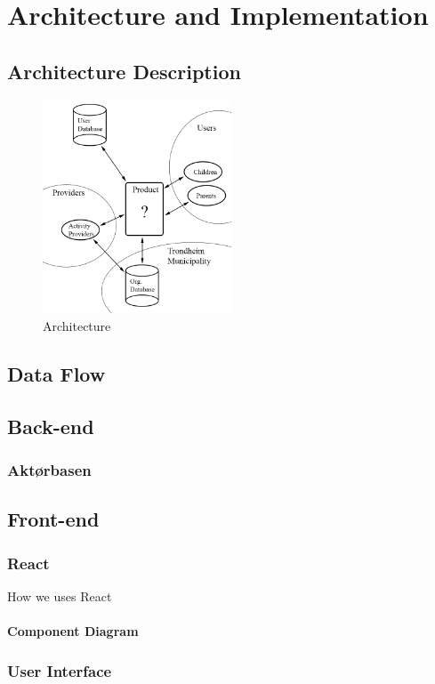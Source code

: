 
\chapter{Architecture and Implementation}

\section{Architecture Description}
 
\begin{figure}[h!]
\centering
    \includegraphics[width=0.5\textwidth]{fig/arkitektur}
\caption{Architecture}
\end{figure}


\section{Data Flow}

\section{Back-end}

\subsection{Aktørbasen}


\section{Front-end}
\subsection{React}
How we uses React
\subsubsection{Component Diagram}

\subsection{User Interface}

\cleardoublepage